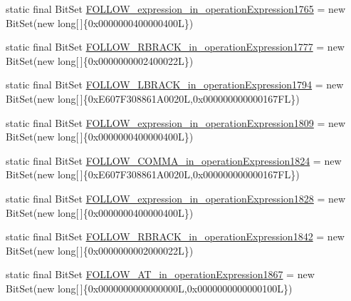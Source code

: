 \begin{DoxyCompactItemize}
static final Bit\-Set \hyperlink{classorg_1_1tzi_1_1use_1_1parser_1_1ocl_1_1_o_c_l_parser_ad9c092ce6cbdf23796260222dee1549d}{F\-O\-L\-L\-O\-W\-\_\-expression\-\_\-in\-\_\-operation\-Expression1765} = new Bit\-Set(new long\mbox{[}$\,$\mbox{]}\{0x0000000400000400\-L\})
\item 
static final Bit\-Set \hyperlink{classorg_1_1tzi_1_1use_1_1parser_1_1ocl_1_1_o_c_l_parser_a507e46ef970d0e99f0dbb5f4fab04c38}{F\-O\-L\-L\-O\-W\-\_\-\-R\-B\-R\-A\-C\-K\-\_\-in\-\_\-operation\-Expression1777} = new Bit\-Set(new long\mbox{[}$\,$\mbox{]}\{0x0000000002400022\-L\})
\item 
static final Bit\-Set \hyperlink{classorg_1_1tzi_1_1use_1_1parser_1_1ocl_1_1_o_c_l_parser_a039d1f61635a03069c1107f953025830}{F\-O\-L\-L\-O\-W\-\_\-\-L\-B\-R\-A\-C\-K\-\_\-in\-\_\-operation\-Expression1794} = new Bit\-Set(new long\mbox{[}$\,$\mbox{]}\{0x\-E607\-F308861\-A0020\-L,0x000000000000167\-F\-L\})
\item 
static final Bit\-Set \hyperlink{classorg_1_1tzi_1_1use_1_1parser_1_1ocl_1_1_o_c_l_parser_af0d1f5b7daa2dc253b05490be0ecd025}{F\-O\-L\-L\-O\-W\-\_\-expression\-\_\-in\-\_\-operation\-Expression1809} = new Bit\-Set(new long\mbox{[}$\,$\mbox{]}\{0x0000000400000400\-L\})
\item 
static final Bit\-Set \hyperlink{classorg_1_1tzi_1_1use_1_1parser_1_1ocl_1_1_o_c_l_parser_a8735a21a9010a0147c46ba4623df44ea}{F\-O\-L\-L\-O\-W\-\_\-\-C\-O\-M\-M\-A\-\_\-in\-\_\-operation\-Expression1824} = new Bit\-Set(new long\mbox{[}$\,$\mbox{]}\{0x\-E607\-F308861\-A0020\-L,0x000000000000167\-F\-L\})
\item 
static final Bit\-Set \hyperlink{classorg_1_1tzi_1_1use_1_1parser_1_1ocl_1_1_o_c_l_parser_ad6c70a09f2d777a652bcaa758a6d5501}{F\-O\-L\-L\-O\-W\-\_\-expression\-\_\-in\-\_\-operation\-Expression1828} = new Bit\-Set(new long\mbox{[}$\,$\mbox{]}\{0x0000000400000400\-L\})
\item 
static final Bit\-Set \hyperlink{classorg_1_1tzi_1_1use_1_1parser_1_1ocl_1_1_o_c_l_parser_a48f118050ec119533a53a4e91033fb65}{F\-O\-L\-L\-O\-W\-\_\-\-R\-B\-R\-A\-C\-K\-\_\-in\-\_\-operation\-Expression1842} = new Bit\-Set(new long\mbox{[}$\,$\mbox{]}\{0x0000000002000022\-L\})
\item 
static final Bit\-Set \hyperlink{classorg_1_1tzi_1_1use_1_1parser_1_1ocl_1_1_o_c_l_parser_a9d3435759e44c563aadcd81b06e13623}{F\-O\-L\-L\-O\-W\-\_\-\-A\-T\-\_\-in\-\_\-operation\-Expression1867} = new Bit\-Set(new long\mbox{[}$\,$\mbox{]}\{0x0000000000000000\-L,0x0000000000000100\-L\})
\item 

\end{DoxyCompactItemize}
